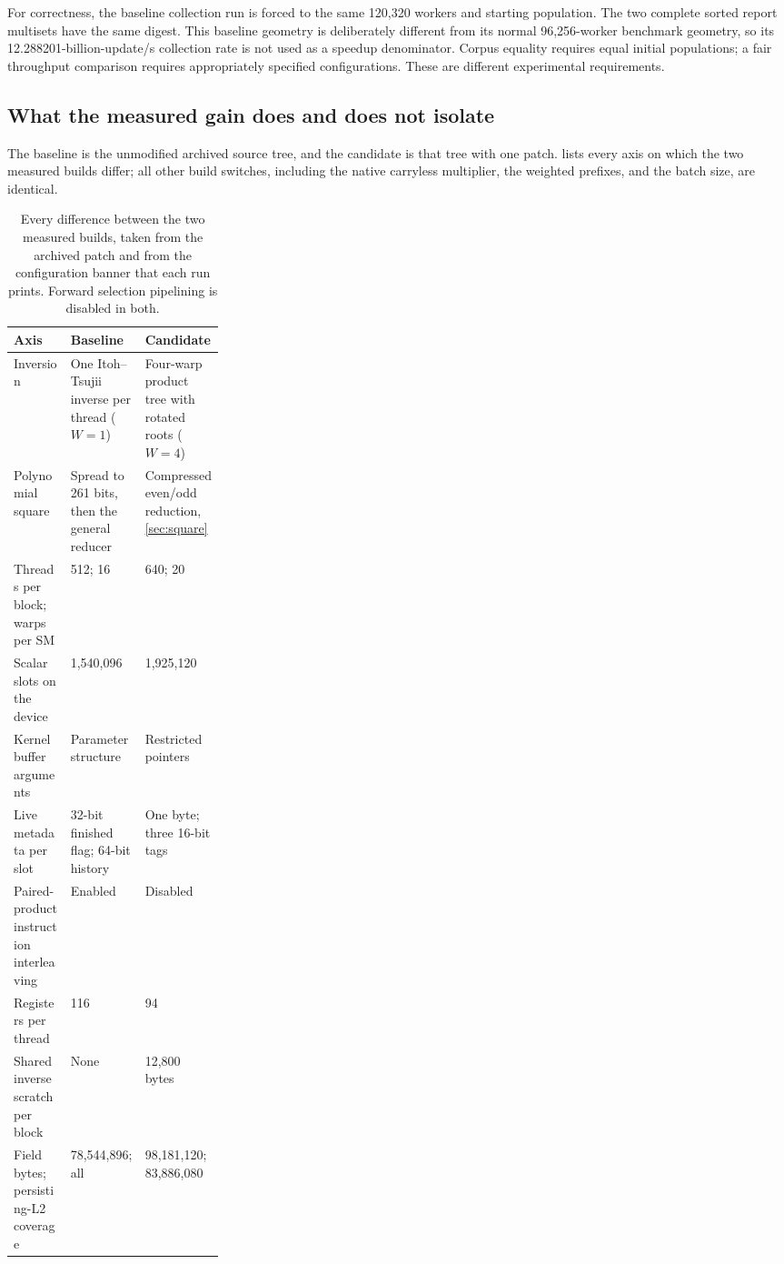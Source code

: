 \documentclass[11pt,a4paper]{article}
\begin{document}
For correctness, the baseline collection run is forced to the same 120,320 workers and starting population. The two complete sorted report multisets have the same digest. This baseline geometry is deliberately different from its normal 96,256-worker benchmark geometry, so its 12.288201-billion-update/s collection rate is not used as a speedup denominator. Corpus equality requires equal initial populations; a fair throughput comparison requires appropriately specified configurations. These are different experimental requirements.

\subsection{What the measured gain does and does not isolate}\label{sec:isolate}
The baseline is the unmodified archived source tree, and the candidate is that tree with one patch.  lists every axis on which the two measured builds differ; all other build switches, including the native carryless multiplier, the weighted prefixes, and the batch size, are identical.

\begin{table}[t]
\centering\small
\begin{tabularx}{\linewidth}{@{}>{\raggedright\arraybackslash}p{0.27\linewidth}YY@{}}
\toprule
Axis & Baseline & Candidate\\
\midrule
Inversion & One Itoh--Tsujii inverse per thread ($W=1$) & Four-warp product tree with rotated roots ($W=4$)\\
Polynomial square & Spread to 261 bits, then the general reducer & Compressed even/odd reduction, \cref{sec:square}\\
Threads per block; warps per SM & 512; 16 & 640; 20\\
Scalar slots on the device & 1,540,096 & 1,925,120\\
Kernel buffer arguments & Parameter structure & Restricted pointers\\
Live metadata per slot & 32-bit finished flag; 64-bit history & One byte; three 16-bit tags\\
Paired-product instruction interleaving & Enabled & Disabled\\
Registers per thread & 116 & 94\\
Shared inverse scratch per block & None & 12,800 bytes\\
Field bytes; persisting-L2 coverage & 78,544,896; all & 98,181,120; 83,886,080\\
\bottomrule
\end{tabularx}
\caption{Every difference between the two measured builds, taken from the archived patch and from the configuration banner that each run prints. Forward selection pipelining is disabled in both.}
\label{tab:config}
\end{table}
\end{document}
